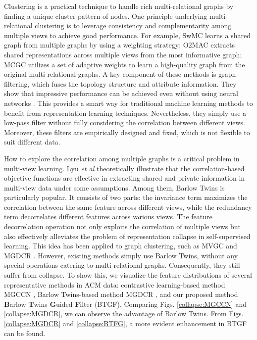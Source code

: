 \documentclass[letterpaper]{article} %
\begin{document}
Clustering is a practical technique to handle rich multi-relational graphs by finding a unique cluster pattern of nodes. One principle underlying multi-relational clustering is to leverage consistency and complementarity among multiple views to achieve good performance. For example, SwMC \cite{nie2017self} learns a shared graph from multiple graphs by using a weighting strategy; O2MAC \cite{fan2020one2multi} extracts shared representations across multiple views from the most informative graph; MCGC \cite{pan2021multi} utilizes a set of adaptive weights to learn a high-quality graph from the original multi-relational graphs. A key component of these methods is graph filtering, which fuses the topology structure and attribute information. They show that impressive performance can be achieved even without using neural networks \cite{lin2023multi, pan2023high}. This provides a smart way for traditional machine learning methods to benefit from representation learning techniques. Nevertheless, they simply use a low-pass filter without fully considering the correlation between different views. Moreover, these filters are empirically designed and fixed, which is not flexible to suit different data.

How to explore the correlation among multiple graphs is a critical problem in multi-view learning. Lyu \textit{et al} \cite{lyu2022understanding} theoretically illustrate that the correlation-based objective functions are effective in extracting shared and private information in multi-view data under some assumptions. Among them, Barlow Twins \cite{zbontar2021barlow} is particularly popular. It consists of two parts: the invariance term maximizes the correlation between the same feature across different views, while the redundancy term decorrelates different features across various views. The feature decorrelation operation not only exploits the correlation of multiple views but also effectively alleviates the problem of representation collapse in self-supervised learning. This idea has been applied to graph clustering, such as MVGC \cite{xia2022multi} and MGDCR \cite{mo2023multiplex}. However, existing methods simply use Barlow Twins, without any special operations catering to multi-relational graphs. Consequently, they still suffer from collapse. To show this, we visualize the feature distributions of several representative methods in ACM data: contrastive learning-based method MGCCN \cite{liu2022deep}, Barlow Twins-based method MGDCR \cite{mo2023multiplex}, and our proposed method \textbf{B}arlow \textbf{T}wins \textbf{G}uided \textbf{F}ilter (BTGF). Comparing Figs. \ref{collapse:MGCCN} and \ref{collapse:MGDCR}, we can observe the advantage of Barlow Twins. From Figs. \ref{collapse:MGDCR} and \ref{collapse:BTFG}, a more evident enhancement in BTGF can be found. 
\end{document}
